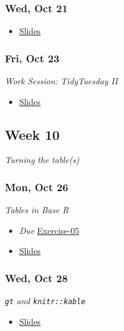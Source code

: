 \documentclass[
  letterpaper,
  DIV=11,
  numbers=noendperiod]{scrartcl}
\providecommand{\tightlist}{%
  \setlength{\itemsep}{0pt}\setlength{\parskip}{0pt}}
\begin{document}
\subsubsection*{Wed, Oct 21}\label{wed-oct-21}

\begin{itemize}
\tightlist
\item
  \href{404.qmd}{Slides}
\end{itemize}

\subsubsection*{Fri, Oct 23}\label{fri-oct-23}

\emph{Work Session: TidyTuesday II}

\begin{itemize}
\tightlist
\item
  \href{404.qmd}{Slides}
\end{itemize}

\subsection*{Week 10}\label{week-10}

\emph{Turning the table(s)}

\subsubsection*{Mon, Oct 26}\label{mon-oct-26}

\emph{Tables in Base R}

\begin{itemize}
\tightlist
\item
   \emph{Due}
  \href{exercises/ex-05-tbd.qmd}{Exercise-05}
\item
  \href{404.qmd}{Slides}
\end{itemize}

\subsubsection*{Wed, Oct 28}\label{wed-oct-28}

\emph{\texttt{gt} and \texttt{knitr::kable}}

\begin{itemize}
\tightlist
\item
  \href{404.qmd}{Slides}
\end{itemize}
\end{document}
